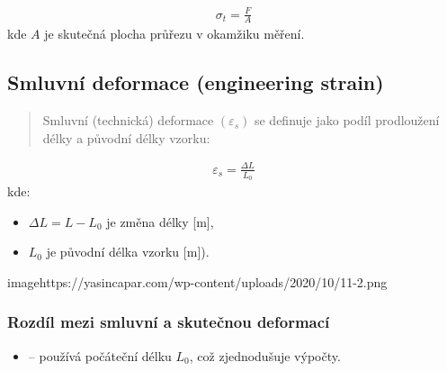 \documentclass[letterpaper,10pt,english]{jupyterBook}
\begin{document}
{{\begin{itemize}
\end{itemize}
\begin{equation*}
\begin{split}
\sigma_t = \frac{F}{A}
\end{split}
\end{equation*}
\sphinxAtStartPar
kde \(A\) je skutečná plocha průřezu v okamžiku měření.


\subsection{Smluvní deformace  (engineering strain)}
\label{\detokenize{Prednasky/2_6_In_u017een_xfdrsk_xe9_a_skute_u010dn_xe9_nap_u011bt_xed:smluvni-deformace-engineering-strain}}\begin{quote}

\sphinxAtStartPar
Smluvní (technická) deformace \((\varepsilon_s)\) se definuje jako podíl prodloužení délky a původní délky vzorku:
\end{quote}
\begin{equation*}
\begin{split}
\varepsilon_s = \frac{\Delta L}{L_0}
\end{split}
\end{equation*}
\sphinxAtStartPar
kde:
\begin{itemize}
\item {} 
\sphinxAtStartPar
\(\Delta L = L - L_0\) je změna délky {[}m{]},

\item {} 
\sphinxAtStartPar
\(L_0\) je původní délka vzorku {[}m{]}).

\end{itemize}

\begin{sphinxuseclass}{{image}https://yasincapar.com/wp-content/uploads/2020/10/11-2.png}
\end{sphinxuseclass}

\subsubsection{Rozdíl mezi smluvní a skutečnou deformací}
\label{\detokenize{Prednasky/2_6_In_u017een_xfdrsk_xe9_a_skute_u010dn_xe9_nap_u011bt_xed:rozdil-mezi-smluvni-a-skutecnou-deformaci}}\begin{itemize}
\item {} 
\sphinxAtStartPar
{} – používá počáteční délku \(L_0\), což zjednodušuje výpočty.


\end{itemize}}}
\end{document}
